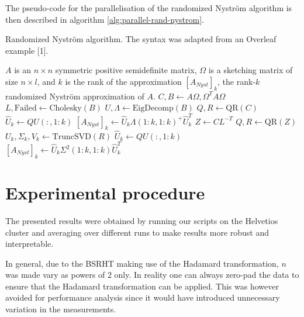 \documentclass[a4paper, 12pt,oneside]{article}
\begin{document}
	The pseudo-code for the parallelisation of the randomized Nystr\"om algorithm is then described in algorithm \ref{alg:parallel-rand-nystrom}.
	\begin{algorithm}[htb]
		\caption{Randomized Nystr\"om algorithm. The syntax was adapted from an Overleaf example [1].}\label{alg:parallel-rand-nystrom}
		\begin{algorithmic}
		\Require $A$ is an $n\times n$ symmetric positive semidefinite matrix, $\Omega$ is a sketching matrix of size $n\times l$, and $k$ is the rank of the approximation
		\Ensure $[A_{N y s t}]_k$, the rank-$k$ randomized Nystr\"om approximation of $A$. 
		\State $C, B \gets A \Omega, \Omega^T A\Omega$ 
		\State $L, \text{Failed} \gets \text{Cholesky}(B)$ 
			\State $U, \Lambda \gets \text{EigDecomp}(B)$ 
			\State $Q, R \gets \text{QR}(C)$ 
			\State $\hat{U}_k \gets Q U(:, 1:k)$ 
			\State $[A_{N y s t}]_k \gets \hat{U}_k \Lambda(1: k, 1: k)^{+} \hat{U}_k^T$ 
		\Else{}
			\State $Z \gets C L^{-T}$ 
			\State $Q, R \gets \text{QR}(Z)$ 
			\State $U_k, \Sigma_k, V_k \gets \text{TruncSVD}(R)$ 
			\State $\hat{U}_k \gets Q U(:, 1:k)$ 
			\State $[A_{N y s t}]_k \gets \hat{U}_k \Sigma^2(1: k, 1: k) \hat{U}_k^T$ 
		\EndIf
		\end{algorithmic}
	\end{algorithm}
	\section{Experimental procedure}
		The presented results were obtained by running our scripts on the Helvetios cluster and averaging over different runs to make results more robust and interpretable.
		
		In general, due to the BSRHT making use of the Hadamard transformation, $n$ was made vary as powers of $2$ only. In reality one can always zero-pad the data to ensure that the Hadamard transformation can be applied. This was however avoided for performance analysis since it would have introduced unnecessary variation in the measurements.  
\end{document}
